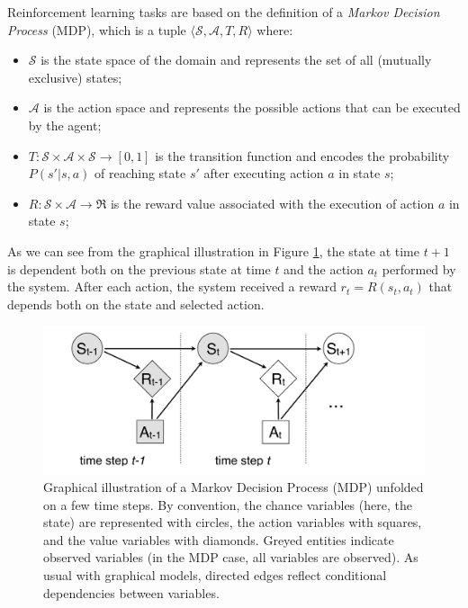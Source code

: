 Reinforcement learning tasks are based on the definition of a \textit{Markov Decision Process} (MDP), which is a tuple $\langle \mathcal{S}, \mathcal{A}, T, R \rangle$ where:
\begin{itemize}
\item $\mathcal{S}$ is the state space of the domain and represents the set of all (mutually exclusive) states;
\item $\mathcal{A}$ is the action space and represents the possible actions that can be executed by the agent;
\item $T: \mathcal{S} \times \mathcal{A} \times \mathcal{S} \rightarrow [0,1]$ is the transition function and encodes the probability $P(s'|s,a)$ of reaching state $s'$ after executing action $a$ in state $s$;
\item $R:  \mathcal{S} \times \mathcal{A} \rightarrow \Re$ is the reward value associated with the execution of action $a$ in state $s$;
\end{itemize}

As we can see from the graphical illustration in Figure \ref{fig:mdp}, the state at time $t+1$ is dependent both on the previous state at time $t$ and the action $a_t$ performed by the system. After each action, the system received a reward $r_t = R(s_t, a_t)$ that depends both on the state and selected action. 

\begin{figure}[h]
\centering
\includegraphics[scale=0.25]{imgs/MDP.pdf}
\caption{Graphical illustration of a Markov Decision Process (MDP) unfolded on a few time steps.  By convention, the chance variables (here, the state) are represented with circles, the action variables with squares, and the value variables with diamonds.  Greyed entities indicate observed variables (in the MDP case, all variables are observed). As usual with graphical models, directed edges reflect conditional dependencies between variables. }
\label{fig:mdp}
\end{figure}

